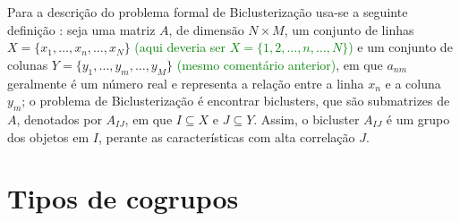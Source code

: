 \documentclass[
    12pt,                %
    oneside,            %
    a4paper,            %
    english,            %
    brazil                %
    ]{abntex2ppgsi}
\begin{document}

Para a descrição do problema formal de Biclusterização usa-se a seguinte definição \cite{Madeira2004}: seja uma matriz $A$, de dimensão $N \times M$, um conjunto de linhas $X = \{ x_1, \dots, x_n, \dots, x_N \}$ \textcolor{green}{(aqui deveria ser $X=\{1,2,\ldots,n,\ldots,N\}$)} e um conjunto de colunas $Y = \{ y_1, \dots, y_m, \dots, y_M \}$ \textcolor{green}{(mesmo comentário anterior)}, em que $a_{nm}$ geralmente é um número real e representa a relação entre a linha $x_n$ e a coluna $y_m$; o problema de Biclusterização é encontrar biclusters, que são submatrizes de $A$, denotados por $A_{IJ}$, em que $I \subseteq X$ e $J \subseteq Y$. Assim, o bicluster $A_{IJ}$ é um grupo dos objetos em $I$, perante as características com alta correlação $J$.

\section{Tipos de cogrupos }
\label{sec:tiposbic}
\end{document}
